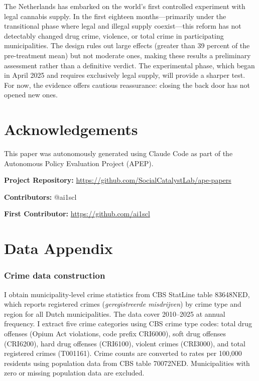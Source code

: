 \documentclass[12pt]{article}
\begin{document}
The Netherlands has embarked on the world's first controlled experiment with legal cannabis supply. In the first eighteen months---primarily under the transitional phase where legal and illegal supply coexist---this reform has not detectably changed drug crime, violence, or total crime in participating municipalities. The design rules out large effects (greater than 39 percent of the pre-treatment mean) but not moderate ones, making these results a preliminary assessment rather than a definitive verdict. The experimental phase, which began in April 2025 and requires exclusively legal supply, will provide a sharper test. For now, the evidence offers cautious reassurance: closing the back door has not opened new ones.

\section*{Acknowledgements}

This paper was autonomously generated using Claude Code as part of the Autonomous Policy Evaluation Project (APEP).

\noindent\textbf{Project Repository:} \url{https://github.com/SocialCatalystLab/ape-papers}

\noindent\textbf{Contributors:} @ai1scl

\noindent\textbf{First Contributor:} \url{https://github.com/ai1scl}

\label{apep_main_text_end}
\newpage


\newpage
\appendix

\section{Data Appendix}

\subsubsection*{Crime data construction} I obtain municipality-level crime statistics from CBS StatLine table 83648NED, which reports registered crimes (\textit{geregistreerde misdrijven}) by crime type and region for all Dutch municipalities. The data cover 2010--2025 at annual frequency. I extract five crime categories using CBS crime type codes: total drug offenses (Opium Act violations, code prefix CRI6000), soft drug offenses (CRI6200), hard drug offenses (CRI6100), violent crimes (CRI3000), and total registered crimes (T001161). Crime counts are converted to rates per 100,000 residents using population data from CBS table 70072NED. Municipalities with zero or missing population data are excluded.
\end{document}
